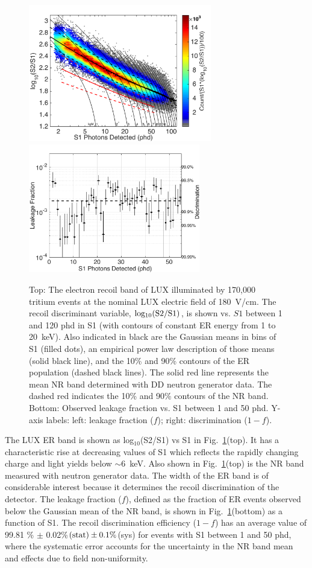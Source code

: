 \begin{figure}[t!]
\includegraphics[width=80mm]{fig11a.pdf} %
\includegraphics[width=75mm]{fig11b.pdf}
\caption{Top: The electron recoil band of LUX illuminated by 170,000 tritium events at the nominal LUX electric field of 180~V/cm.  The recoil discriminant variable, $\rm log_{10}(S2/S1)$, is shown vs. $S1$ between 1 and 120 phd in S1 (with contours of constant ER energy from 1 to 20~keV). Also indicated in black are the Gaussian means in bins of S1 (filled dots), an empirical power law description of those means (solid black line), and the 10\% and 90\% contours of the ER population (dashed black lines). The solid red line represents the mean NR band determined with DD neutron generator data. The dashed red indicates the 10\% and 90\% contours of the NR band. Bottom: Observed leakage fraction vs. S1 between 1 and 50 phd. Y-axis labels: left: leakage fraction ($f$); right: discrimination ($1-f$).}
\label{fig:ER_band}
\end{figure}

The LUX ER band is shown as log$_{10}$(S2/S1) vs S1 in Fig.~\ref{fig:ER_band}(top).  It has a characteristic rise at decreasing values of S1 which reflects the rapidly changing charge and light yields below $\sim$6~keV.  Also shown in Fig.~\ref{fig:ER_band}(top) is the NR band measured with neutron generator data\cite{lux-reanalysis}. The width of the ER band is of considerable interest because it determines the recoil discrimination of the detector. The leakage fraction ($f$), defined as the fraction of ER events observed below the Gaussian mean of the NR band, is shown in Fig.~\ref{fig:ER_band}(bottom) as a function of S1. The recoil discrimination efficiency ($1-f$) has an average value of 99.81 \% $\pm$ 0.02\%$\rm (stat) \pm 0.1\%$(sys) for events with S1 between 1 and 50 phd, where the systematic error accounts for the uncertainty in the NR band mean and effects due to field non-uniformity.


